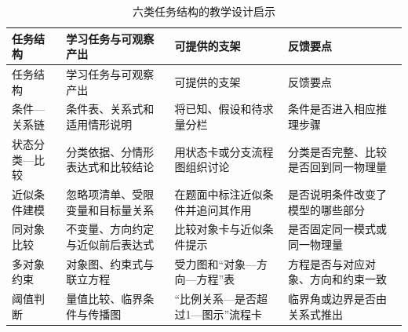 \documentclass[
  12pt,
  a4paper,twoside,openany]{ctexbook}
\begin{document}
\begin{longtable}[]{@{}
  >{\raggedright\arraybackslash}p{}
  >{\raggedright\arraybackslash}p{}
  >{\raggedright\arraybackslash}p{}
  >{\raggedright\arraybackslash}p{}@{}}
\caption{六类任务结构的教学设计启示}\tabularnewline
\toprule\noalign{}
\rowcolor{ThesisPale}
\begin{minipage}[b]{\linewidth}\raggedright
任务结构
\end{minipage} & \begin{minipage}[b]{\linewidth}\raggedright
学习任务与可观察产出
\end{minipage} & \begin{minipage}[b]{\linewidth}\raggedright
可提供的支架
\end{minipage} & \begin{minipage}[b]{\linewidth}\raggedright
反馈要点
\end{minipage} \\
\midrule\noalign{}
\endfirsthead
\toprule\noalign{}
\rowcolor{ThesisPale}
\begin{minipage}[b]{\linewidth}\raggedright
任务结构
\end{minipage} & \begin{minipage}[b]{\linewidth}\raggedright
学习任务与可观察产出
\end{minipage} & \begin{minipage}[b]{\linewidth}\raggedright
可提供的支架
\end{minipage} & \begin{minipage}[b]{\linewidth}\raggedright
反馈要点
\end{minipage} \\
\midrule\noalign{}
\endhead
\bottomrule\noalign{}
\endlastfoot
条件---关系链 & 条件表、关系式和适用情形说明 & 将已知、假设和待求量分栏
& 条件是否进入相应推理步骤 \\
状态分类---比较 & 分类依据、分情形表达式和比较结论 &
用状态卡或分支流程图组织讨论 & 分类是否完整、比较是否回到同一物理量 \\
近似条件建模 & 忽略项清单、受限变量和目标量关系 &
在题面中标注近似条件并追问其作用 & 是否说明条件改变了模型的哪些部分 \\
同对象比较 & 不变量、方向约定与近似前后表达式 & 比较对象卡与近似条件提示
& 是否固定同一模式或同一物理量 \\
多对象约束 & 对象图、约束式与联立方程 & 受力图和``对象---方向---方程''表
& 方程是否与对应对象、方向和约束一致 \\
阈值判断 & 量值比较、临界条件与传播图 &
``比例关系---是否超过1---图示''流程卡 & 临界角或边界是否由关系式推出 \\
\end{longtable}
\end{document}
